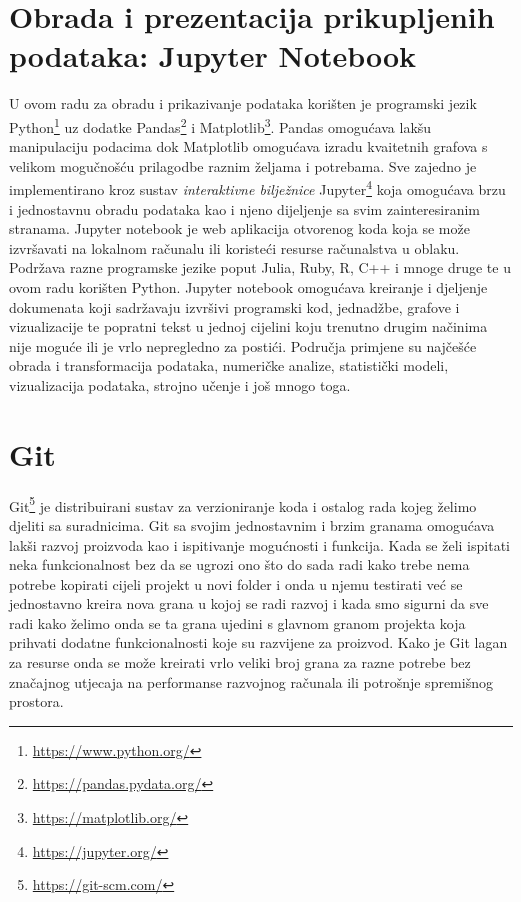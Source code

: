 \section{Obrada i prezentacija prikupljenih podataka: Jupyter Notebook}
U ovom radu za obradu i prikazivanje podataka korišten je programski jezik Python\footnote{\href{https://www.python.org/}{https://www.python.org/}} uz dodatke Pandas\footnote{\href{https://pandas.pydata.org/}{https://pandas.pydata.org/}} i Matplotlib\footnote{\href{https://matplotlib.org/}{https://matplotlib.org/}}.
Pandas omogućava lakšu manipulaciju podacima dok Matplotlib omogućava izradu kvaitetnih grafova s velikom mogučnošću prilagodbe raznim željama i potrebama.
Sve zajedno je implementirano kroz sustav \emph{interaktivne bilježnice} Jupyter\footnote{\href{https://jupyter.org/}{https://jupyter.org/}} koja omogućava brzu i jednostavnu obradu podataka kao i njeno dijeljenje sa svim zainteresiranim stranama.
Jupyter notebook je web aplikacija otvorenog koda koja se može izvršavati na lokalnom računalu ili koristeći resurse računalstva u oblaku.
Podržava razne programske jezike poput Julia, Ruby, R, C++ i mnoge druge te u ovom radu korišten Python.
Jupyter notebook omogućava kreiranje i djeljenje dokumenata koji sadržavaju izvršivi programski kod, jednadžbe, grafove i vizualizacije te popratni tekst u jednoj cijelini koju trenutno drugim načinima nije moguće ili je vrlo nepregledno za postići.
Područja primjene su najčešće obrada i transformacija podataka, numeričke analize, statistički modeli, vizualizacija podataka, strojno učenje i još mnogo toga.

\section{Git}
Git\footnote{\href{https://git-scm.com/}{https://git-scm.com/}} je distribuirani sustav za verzioniranje koda i ostalog rada kojeg želimo djeliti sa suradnicima.
Git sa svojim jednostavnim i brzim granama omogućava lakši razvoj proizvoda kao i ispitivanje mogućnosti i funkcija.
Kada se želi ispitati neka funkcionalnost bez da se ugrozi ono što do sada radi kako trebe nema potrebe kopirati cijeli projekt u novi folder i onda u njemu testirati već se jednostavno kreira nova grana u kojoj se radi razvoj i kada smo sigurni da sve radi kako želimo onda se ta grana ujedini s glavnom granom projekta koja prihvati dodatne funkcionalnosti koje su razvijene za proizvod.
Kako je Git lagan za resurse onda se može kreirati vrlo veliki broj grana za razne potrebe bez značajnog utjecaja na performanse razvojnog računala ili potrošnje spremišnog prostora.

